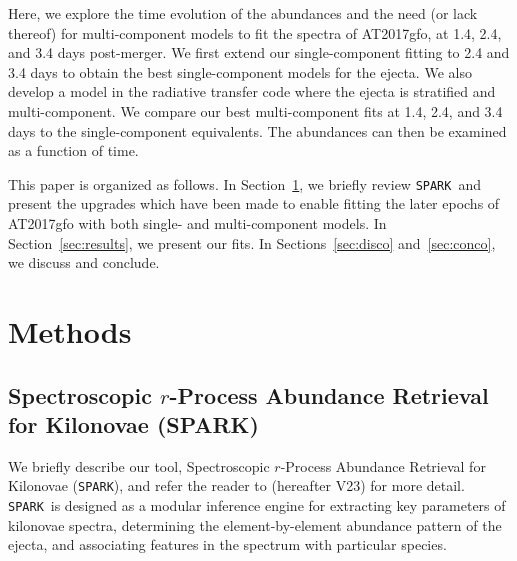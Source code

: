 \documentclass[twocolumn, twocolappendix]{aastex63}
\def\SPARK{\texttt{SPARK}}
\begin{document}
Here, we explore the time evolution of the abundances and the need (or lack thereof) for multi-component models to fit the spectra of AT2017gfo, at 1.4, 2.4, and 3.4 days post-merger. We first extend our single-component fitting to 2.4 and 3.4 days to obtain the best single-component models for the ejecta. We also develop a model in the radiative transfer code where the ejecta is stratified and multi-component. We compare our best multi-component fits at 1.4, 2.4, and 3.4 days to the single-component equivalents. The abundances can then be examined as a function of time. 

This paper is organized as follows. In Section~\ref{sec:methods}, we briefly review \SPARK~and present the upgrades which have been made to enable fitting the later epochs of AT2017gfo with both single- and multi-component models. In Section~\ref{sec:results}, we present our fits. In Sections~\ref{sec:disco} and~\ref{sec:conco}, we discuss and conclude.



    
    
    


\section{Methods}\label{sec:methods}

\subsection{Spectroscopic $r$-Process Abundance Retrieval for Kilonovae (\textsc{SPARK})}\label{ssc:spark-summary}

We briefly describe our tool, Spectroscopic $r$-Process Abundance Retrieval for Kilonovae (\SPARK), and refer the reader to \cite{vieira23} (hereafter V23) for more detail. \SPARK~is designed as a modular inference engine for extracting key parameters of kilonovae spectra, determining the element-by-element abundance pattern of the ejecta, and associating features in the spectrum with particular species. 
\end{document}
